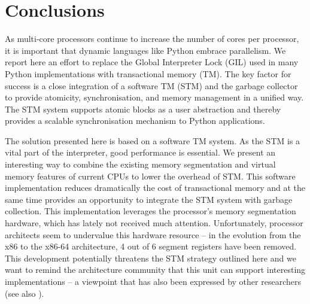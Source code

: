 \documentclass{sigplanconf}
\begin{document}


\section{Conclusions}

As multi-core processors continue to increase the number of cores per
processor, it is important that dynamic languages like Python embrace
parallelism.  We report here an effort to replace the Global
Interpreter Lock (GIL) used in many Python implementations with
transactional memory (TM). The key factor for success is a close
integration of a software TM (STM) and the garbage collector to
provide atomicity, synchronisation, and memory management in a unified
way.  The STM system supports atomic blocks as a user abstraction and
thereby provides a scalable synchronisation mechanism to Python
applications.


The solution presented here is based on a software TM system.  As the
STM is a vital part of the interpreter, good performance is
essential. We present an interesting way to combine the existing
memory segmentation and virtual memory features of current CPUs to
lower the overhead of STM. This software implementation reduces
dramatically the cost of transactional memory and at the same time
provides an opportunity to integrate the STM system with garbage
collection.  This implementation leverages the processor's memory
segmentation hardware, which has lately not received much attention.
Unfortunately, processor architects seem to
undervalue this hardware resource -- in the evolution from the x86 to
the x86{-}64 architecture, 4 out of 6 segment registers have been
removed. This development potentially threatens the STM strategy
outlined here and we want to remind the architecture community that
this unit can support interesting implementations -- a viewpoint that
has also been expressed by other researchers (see also
\cite{bennet10}).
\end{document}
